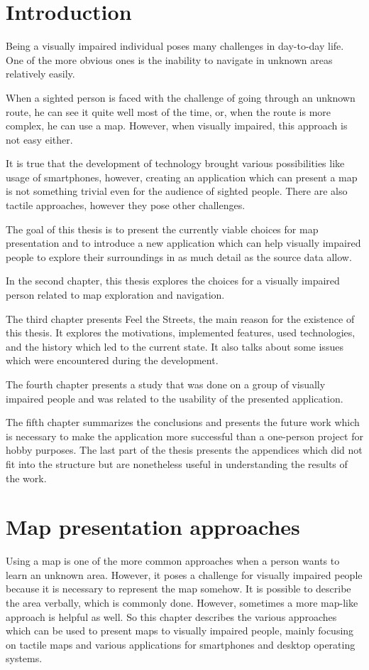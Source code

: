 \documentclass[nolof,digital]{fithesis3}
\begin{document}
\chapter{Introduction}
Being a visually impaired individual poses many challenges in day-to-day life. One of the more obvious ones is the inability to navigate in unknown areas relatively easily.

When a sighted person is faced with the challenge of going through an unknown route, he can see it quite well most of the time, or, when the route is more complex, he can use a map. However, when visually impaired, this approach is not easy either.

It is true that the development of technology brought various possibilities like usage of smartphones, however, creating an application which can present a map is not something trivial even for the audience of sighted people. There are also tactile approaches, however they pose other challenges.

The goal of this thesis is to present the currently viable choices for map presentation and to introduce a new application which can help visually impaired people to explore their surroundings in as much detail as the source data allow.

In the second chapter, this thesis explores the choices for a visually impaired person related to map exploration and navigation.

The third chapter presents Feel the Streets, the main reason for the existence of this thesis. It explores the motivations, implemented features, used technologies, and the history which led to the current state. It also talks about some issues which were encountered during the development.

The fourth chapter presents a study that was done on a group of visually impaired people and was related to the usability of the presented application.

The fifth chapter summarizes the conclusions and presents the future work which is necessary to make the application more successful than a one-person project for hobby purposes. The last part of the thesis presents the appendices which did not fit into the structure but are nonetheless useful in understanding the results of the work.
\chapter{Map presentation approaches}
Using a map is one of the more common approaches when a person wants to learn an unknown area. However, it poses a challenge for visually impaired people because it is necessary to represent the map somehow. It is possible to describe the area verbally, which is commonly done. However, sometimes a more map-like approach is helpful as well. So this chapter describes the various approaches which can be used to present maps to visually impaired people, mainly focusing on tactile maps and various applications for smartphones and desktop operating systems.
\end{document}
